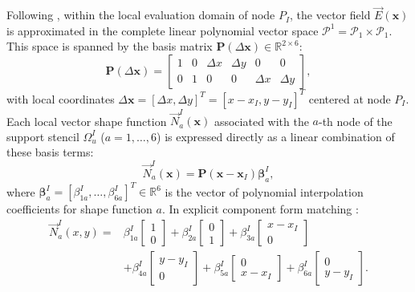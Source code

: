 \documentclass[preprint,12pt]{elsarticle}
\begin{document}
Following \cite{stable_vnmm2d_2026}, within the local evaluation domain of node $P_I$, the vector field $\vec{E}(\mathbf{x})$ is approximated in the complete linear polynomial vector space $\mathcal{P}^1 = \mathcal{P}_1 \times \mathcal{P}_1$. This space is spanned by the basis matrix $\mathbf{P}(\Delta\mathbf{x}) \in \mathbb{R}^{2 \times 6}$:
\begin{equation}
    \mathbf{P}(\Delta\mathbf{x}) = \begin{bmatrix}
        1 & 0 & \Delta x & \Delta y & 0        & 0        \\
        0 & 1 & 0        & 0        & \Delta x & \Delta y
    \end{bmatrix},
    \label{eq:P_basis_matrix}
\end{equation}
with local coordinates $\Delta\mathbf{x} = [\Delta x, \Delta y]^T = [x - x_I, y - y_I]^T$ centered at node $P_I$.
Each local vector shape function $\vec{N}_a^I(\mathbf{x})$ associated with the $a$-th node of the support stencil $\Omega_u^I$ ($a = 1, \dots, 6$) is expressed directly as a linear combination of these basis terms:
\begin{equation}
    \vec{N}_a^I(\mathbf{x}) = \mathbf{P}(\mathbf{x} - \mathbf{x}_I) \boldsymbol{\beta}_a^I,
    \label{eq:shape_functions}
\end{equation}
where $\boldsymbol{\beta}_a^I = [\beta_{1a}^I, \dots, \beta_{6a}^I]^T \in \mathbb{R}^6$ is the vector of polynomial interpolation coefficients for shape function $a$. In explicit component form matching \cite{stable_vnmm2d_2026}:
\begin{equation}
    \begin{aligned}
        \vec{N}_a^I(x, y) = & \beta_{1a}^I \begin{bmatrix} 1 \\ 0 \end{bmatrix} + \beta_{2a}^I \begin{bmatrix} 0 \\ 1 \end{bmatrix} + \beta_{3a}^I \begin{bmatrix} x - x_I \\ 0 \end{bmatrix}                \\
                            & + \beta_{4a}^I \begin{bmatrix} y - y_I \\ 0 \end{bmatrix} + \beta_{5a}^I \begin{bmatrix} 0 \\ x - x_I \end{bmatrix} + \beta_{6a}^I \begin{bmatrix} 0 \\ y - y_I \end{bmatrix}.
    \end{aligned}
    \label{eq:P1_shape_function_expansion_mlpg}
\end{equation}
\end{document}
